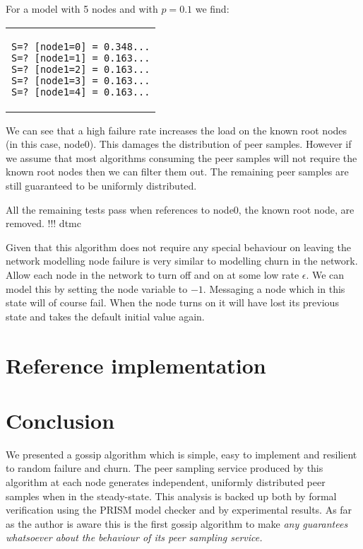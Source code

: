 \documentclass[a4paper,10pt]{article}
\newcommand{\prismmodel}[1]{
  \begin{quotation}
  \footnotesize
  
  \end{quotation}
}
\newenvironment{prismprop}[0]{
  \begin{center}
  \begin{tabular}{c}
  \footnotesize
}{
  \end{tabular}
  \end{center}
}
\begin{document}
\prismmodel{ctmc_full_error}

For a model with 5 nodes and with $p=0.1$ we find:

\begin{prismprop}
\begin{lstlisting}
S=? [node1=0] = 0.348...
S=? [node1=1] = 0.163...
S=? [node1=2] = 0.163...
S=? [node1=3] = 0.163...
S=? [node1=4] = 0.163...
\end{lstlisting}
\end{prismprop}

We can see that a high failure rate increases the load on the known root nodes (in this case, node0). This damages the distribution of peer samples. However if we assume that most algorithms consuming the peer samples will not require the known root nodes then we can filter them out. The remaining peer samples are still guaranteed to be uniformly distributed.  

All the remaining tests pass when references to node0, the known root node, are removed. !!! dtmc

Given that this algorithm does not require any special behaviour on leaving the network modelling node failure is very similar to modelling churn in the network. Allow each node in the network to turn off and on at some low rate $\epsilon$. We can model this by setting the node variable to $-1$. Messaging a node which in this state will of course fail. When the node turns on it will have lost its previous state and takes the default initial value again.

\section{Reference implementation}

\section{Conclusion}

We presented a gossip algorithm which is simple, easy to implement and resilient to random failure and churn. The peer sampling service produced by this algorithm at each node generates independent, uniformly distributed peer samples when in the steady-state. This analysis is backed up both by formal verification using the PRISM model checker and by experimental results. As far as the author is aware this is the first gossip algorithm to make \em any \em guarantees whatsoever about the behaviour of its peer sampling service.
\end{document}
